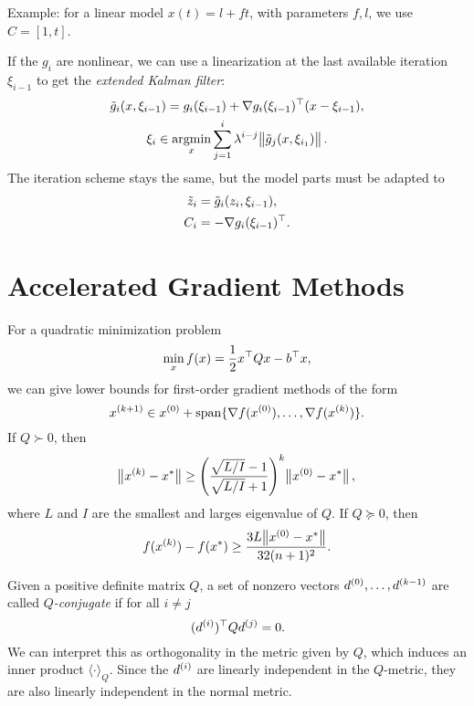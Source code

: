 \documentclass{article}
\begin{document}
Example: for a linear model \(x(t) = l + ft\), with parameters \(f, l\), we use \(C = [1, t]\).



If the \(g_i\) are nonlinear, we can use a linearization at the last available iteration
\(\xi_{i-1}\) to get the \emph{extended Kalman filter}:
\begin{gather*}
  \tilde{g}_i(x, \xi_{i-1}) = g_i(\xi_{i-1}) + \T{\nabla g_i(\xi_{i-1})}(x - \xi_{i-1}), \\
  \xi_i \in \argmin_x \sum_{j=1}^{i} \lambda^{i-j} \enVert[1]{\tilde{g}_j(x, \xi_{i_1})}.
\end{gather*}
The iteration scheme stays the same, but the model parts must be adapted to
\begin{align*}
  \tilde{z}_i &= \tilde{g}_i(z_i, \xi_{i-1}), \\
  C_i &= - \T{\nabla g_i(\xi_{i-1})}.
\end{align*}


\section{Accelerated Gradient Methods}


For a quadratic minimization problem
\begin{equation*}
  \min_x f(x) = \frac{1}{2} \T{x} Q x - \T{b}x,
\end{equation*}
we can give lower bounds for first-order gradient methods of the form
\begin{equation*}
  \kth[k+1]{x} \in \kth[0]{x} + \Span \{\nabla f(\kth[0]{x}), \ldots, \nabla f(\kth{x})\}.
\end{equation*}
If \(Q \succ 0\), then
\begin{equation*}
  \enVert[1]{\kth{x} - x^*}
  \geq \left( \frac{\sqrt{L/I} - 1}{\sqrt{L/I} + 1} \right)^k \enVert[1]{\kth[0]{x} - x^*},
\end{equation*}
where \(L\) and \(I\) are the smallest and larges eigenvalue of \(Q\).  If \(Q \succeq 0\), then
\begin{equation*}
  f(\kth{x}) - f(x^*) \geq \frac{3L \enVert[1]{\kth[0]{x} - x^*}}{32 (n+1)^2}.
\end{equation*}



Given a positive definite matrix \(Q\), a set of nonzero vectors \(\kth[0]{d}, \ldots, \kth[k-1]{d}\) are
called \emph{\(Q\)-conjugate} if for all \(i \neq j\)
\begin{equation*}
  \T{(\kth[i]{d})} Q \kth[j]{d} = 0.
\end{equation*}
We can interpret this as orthogonality in the metric given by \(Q\), which induces an inner product
\(\langle \cdot \rangle_Q\).  Since the \(\kth[i]{d}\) are linearly independent in the \(Q\)-metric,
they are also linearly independent in the normal metric.
\end{document}

